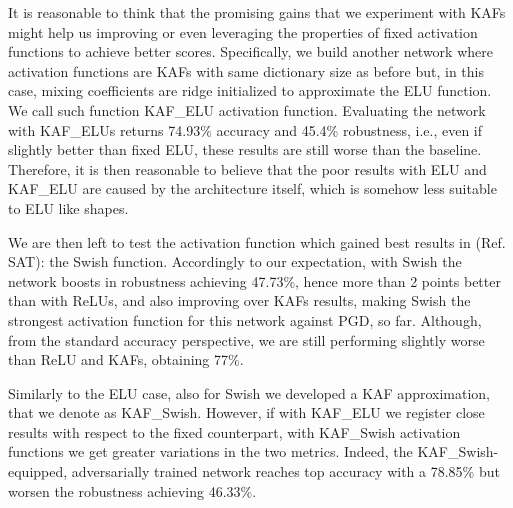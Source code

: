 \documentclass[LaM,binding=0.6cm]{./packages/sapthesis/sapthesis}
\begin{document}
        It is reasonable to think that the promising gains that we experiment with KAFs might help us improving or even leveraging the properties of fixed activation functions
        to achieve better scores. Specifically, we build another network where activation functions are KAFs with same dictionary size as before but, in this case, mixing coefficients
        are ridge initialized to approximate the ELU function. We call such function KAF\_ELU activation function. Evaluating the network with KAF\_ELUs returns 74.93\% accuracy 
        and 45.4\% robustness, i.e., even if slightly better than fixed ELU, these results are still worse than the baseline. Therefore, it is then reasonable to believe that the poor 
        results with ELU and KAF\_ELU are caused by the architecture itself, which is somehow less suitable to ELU like shapes.

        We are then left to test the activation function which gained best results in (Ref. SAT): the Swish function. Accordingly to our expectation, with Swish the network 
        boosts in robustness achieving 47.73\%, hence more than 2 points better than with ReLUs, and also improving over KAFs results, making Swish the strongest activation 
        function for this network against PGD, so far. Although, from the standard accuracy perspective, we are still performing slightly worse than ReLU and KAFs, obtaining 
        77\%.

        Similarly to the ELU case, also for Swish we developed a KAF approximation, that we denote as KAF\_Swish. However, if with KAF\_ELU we register close results with respect 
        to the fixed counterpart, with KAF\_Swish activation functions we get greater variations in the two metrics. Indeed, the KAF\_Swish-equipped, adversarially trained 
        network reaches top accuracy with a 78.85\% but worsen the robustness achieving 46.33\%.
\end{document}
